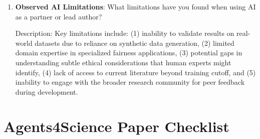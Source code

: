 \documentclass{article}
\begin{document}
\begin{enumerate}
    Answer: \involvementD{}

    Explanation: Claude AI authored the complete manuscript including abstract, introduction, related work, methodology, results, discussion, and conclusion sections. The AI also created all mathematical formulations, generated all figures and visualizations, formatted tables, and structured the overall narrative flow of the paper.

    \item \textbf{Observed AI Limitations}: What limitations have you found when using AI as a partner or lead author?

    Description: Key limitations include: (1) inability to validate results on real-world datasets due to reliance on synthetic data generation, (2) limited domain expertise in specialized fairness applications, (3) potential gaps in understanding subtle ethical considerations that human experts might identify, (4) lack of access to current literature beyond training cutoff, and (5) inability to engage with the broader research community for peer feedback during development.
\end{enumerate}

\newpage

\section*{Agents4Science Paper Checklist}
\end{document}
